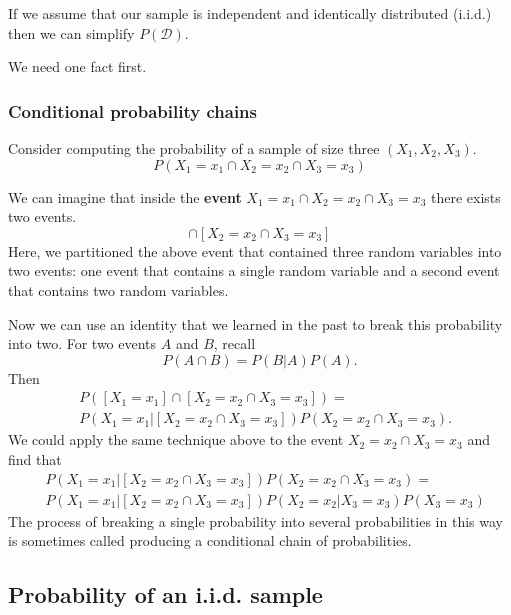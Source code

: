 If we assume that our sample is independent and identically distributed (i.i.d.) then we can simplify $P(\mathcal{D})$. 

We need one fact first. 

\subsubsection{Conditional probability chains}

Consider computing the probability of a sample of size three $(X_{1},X_{2},X_{3})$.
\begin{equation}
    P(X_{1}=x_{1} \cap X_{2}=x_{2} \cap X_{3}=x_{3})
\end{equation}

We can imagine that inside the \textbf{event} $X_{1}=x_{1} \cap X_{2}=x_{2} \cap X_{3}=x_{3}$ there exists two events. 
\begin{equation}
    [X_{1}=x_{1}] \cap [X_{2}=x_{2} \cap X_{3}=x_{3}]
\end{equation}
Here, we partitioned the above event that contained three random variables into two events: one event that contains a single random variable and a second event that contains two random variables.

Now we can use an identity that we learned in the past to break this probability into two.
For two events $A$ and $B$, recall  
\begin{equation}
    P(A \cap B) = P(B|A) P(A).
\end{equation}
Then
\begin{align}
    &P( [X_{1}=x_{1}] \cap [X_{2}=x_{2} \cap X_{3}=x_{3}]) = \\
    &P( X_{1}=x_{1} |  [X_{2}=x_{2} \cap X_{3}=x_{3}]) P(X_{2}=x_{2} \cap X_{3}=x_{3}). 
\end{align}
We could apply the same technique above to the event $X_{2}=x_{2} \cap X_{3}=x_{3}$ and find that 
\begin{align}
    &P( X_{1}=x_{1} |  [X_{2}=x_{2} \cap X_{3}=x_{3}]) P(X_{2}=x_{2} \cap X_{3}=x_{3}) =  \\
    &P( X_{1}=x_{1} |  [X_{2}=x_{2} \cap X_{3}=x_{3}]) P(X_{2}=x_{2} |  X_{3}=x_{3}) P(X_{3}=x_{3})  
\end{align}
The process of breaking a single probability into several probabilities in this way is sometimes called producing a conditional chain of probabilities. 


\subsection{Probability of an i.i.d. sample}

